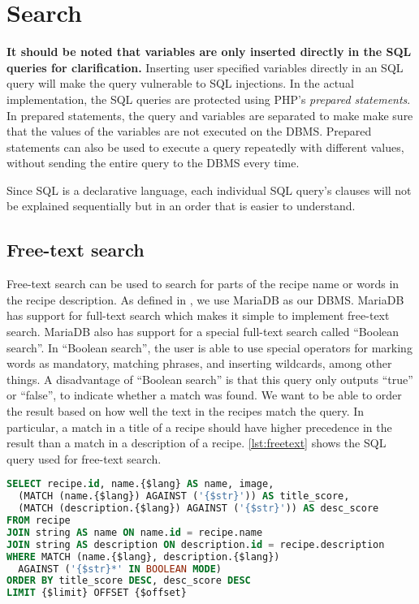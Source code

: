 \section{Search}
\textbf{It should be noted that variables are only inserted directly in the SQL queries for clarification.} Inserting user specified variables directly in an SQL query will make the query vulnerable to SQL injections. In the actual implementation, the SQL queries are protected using PHP's \textit{prepared statements}. In prepared statements, the query and variables are separated to make make sure that the values of the variables are not executed on the DBMS. Prepared statements can also be used to execute a query repeatedly with different values, without sending the entire query to the DBMS every time.

Since SQL is a declarative language, each individual SQL query's clauses will not be explained sequentially but in an order that is easier to understand.



\subsection*{Free-text search}
Free-text search can be used to search for parts of the recipe name or words in the recipe description. As defined in , we use MariaDB as our DBMS. MariaDB has support for full-text search which makes it simple to implement free-text search. MariaDB also has support for a special full-text search called ``Boolean search''. In ``Boolean search'', the user is able to use special operators for marking words as mandatory, matching phrases, and inserting wildcards, among other things. A disadvantage of ``Boolean search'' is that this query only outputs ``true'' or ``false'', to indicate whether a match was found. We want to be able to order the result based on how well the text in the recipes match the query. In particular, a match in a title of a recipe should have higher precedence in the result than a match in a description of a recipe.
\autoref{lst:freetext} shows the SQL query used for free-text search.

\begin{lstlisting}[language=SQL, morekeywords={AGAINST,OFFSET,BOOLEAN,MODE}, float=h, label={lst:freetext}, caption={Free-text search.}]
SELECT recipe.id, name.{$lang} AS name, image,
  (MATCH (name.{$lang}) AGAINST ('{$str}')) AS title_score,
  (MATCH (description.{$lang}) AGAINST ('{$str}')) AS desc_score
FROM recipe
JOIN string AS name ON name.id = recipe.name
JOIN string AS description ON description.id = recipe.description
WHERE MATCH (name.{$lang}, description.{$lang})
  AGAINST ('{$str}*' IN BOOLEAN MODE)
ORDER BY title_score DESC, desc_score DESC
LIMIT {$limit} OFFSET {$offset}
\end{lstlisting}

